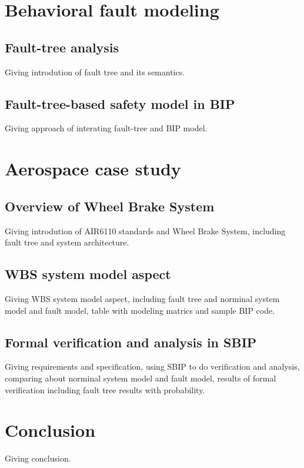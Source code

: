 \documentclass[runningheads]{llncs}
\begin{document}


\section{Behavioral fault modeling}
\label{rsc:bfm}

\subsection{Fault-tree analysis}
Giving introdution of fault tree and its semantics.

\subsection{Fault-tree-based safety model in BIP}
Giving approach of interating fault-tree and BIP model.

\section{Aerospace case study}
\label{rsc:casestudy}

\subsection{Overview of Wheel Brake System}
Giving introdution of AIR6110 standards and Wheel Brake System, including fault tree and system architecture.

\subsection{WBS system model aspect}
Giving WBS system model aspect, including fault tree and norminal system model and fault model, table with modeling matrics and sample BIP code.

\subsection{Formal verification and analysis in SBIP}
Giving requirements and specification, using SBIP to do verification and analysis, comparing about norminal system model and fault model, results of formal verification including fault tree results with probability.

\section{Conclusion}
\label{rsc:conclusion}
Giving conclusion.
\end{document}
